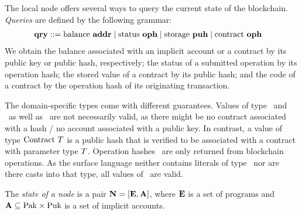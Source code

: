 \documentclass[a4paper]{llncs}
\begin{document}
The local node offers several ways to query the current state of
the blockchain.
\emph{Queries} are defined by the following grammar:
\begin{align*}
  \textbf{qry} & ::=
         \text{balance $\textbf{addr}$}
  \mid \text{status $\textbf{oph}$}
  \mid \text{storage $\textbf{puh}$}
  \mid \text{contract $\textbf{oph}$}
\end{align*}
We obtain the balance associated with an implicit account or a
contract by its public key or public hash, respectively; the status of
a submitted operation by its operation hash; the stored value of a
contract by its public hash; and the code of a contract by the
operation hash of its originating transaction.

The domain-specific types come with different guarantees. Values of
type \TPUH\ and \TPUK\ as well as \TADDR\ are not necessarily valid,
as there might be no contract associated with a hash / no account
associated with a public key. In contrast, a value of type
$\text{Contract}\ T$ is a public hash that is verified to be associated
with a contract with parameter type $T$. Operation hashes \OPH\
are only returned from blockchain operations. As the surface language
neither contains literals of type \TOPH\ nor are there casts into
that type, all values of \TOPH\ are valid. 

\begin{definition}%
  The \emph{state of a node} is a pair
  $\textbf{N} = [ \textbf{E}, \textbf{A}
  ]$, where $\textbf{E}$ is a
  set of programs and $\textbf{A} \subseteq \text{Pak} \times \text{Puk}$  is a set of
  implicit accounts.
\end{definition}
\end{document}
